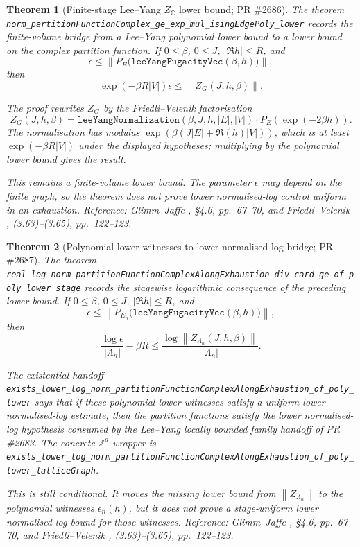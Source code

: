 \documentclass[a4paper,11pt]{article}
\newtheorem{theorem}{Theorem}
\begin{document}
\begin{theorem}[Finite-stage Lee--Yang \(Z_{\mathbb C}\) lower bound; PR \#2686]
The theorem
\texttt{norm\_partitionFunctionComplex\_ge\_exp\_mul\_isingEdgePoly\_lower}
records the finite-volume bridge from a Lee--Yang polynomial lower bound to a
lower bound on the complex partition function.  If \(0\le \beta\), \(0\le J\),
\(|\Re h|\le R\), and
\[
  \epsilon \le
  \left\|P_E\bigl(\texttt{leeYangFugacityVec}(\beta,h)\bigr)\right\|,
\]
then
\[
  \exp(-\beta R |V|)\epsilon
    \le \left\|Z_G(J,h,\beta)\right\|.
\]

The proof rewrites \(Z_G\) by the Friedli--Velenik factorisation
\[
  Z_G(J,h,\beta)=
  \texttt{leeYangNormalization}(\beta,J,h,|E|,|V|)
  \cdot P_E(\exp(-2\beta h)).
\]
The normalisation has modulus
\(\exp(\beta(J|E|+\Re(h)|V|))\), which is at least
\(\exp(-\beta R|V|)\) under the displayed hypotheses; multiplying by the
polynomial lower bound gives the result.

This remains a finite-volume lower bound.  The parameter \(\epsilon\) may
depend on the finite graph, so the theorem does not prove lower
normalised-log control uniform in an exhaustion.
Reference: Glimm--Jaffe \cite{glimm-jaffe}, \S 4.6, pp.~67--70, and
Friedli--Velenik \cite{friedli-velenik}, (3.63)--(3.65), pp.~122--123.
\end{theorem}

\begin{theorem}[Polynomial lower witnesses to lower normalised-log bridge; PR \#2687]
The theorem
\texttt{real\_log\_norm\_partitionFunctionComplexAlongExhaustion\_div\_card\_ge\_of\_poly\_lower\_stage}
records the stagewise logarithmic consequence of the preceding lower bound.
If \(0\le\beta\), \(0\le J\), \(|\Re h|\le R\), and
\[
  \epsilon \le
  \left\|P_{E_n}\bigl(\texttt{leeYangFugacityVec}(\beta,h)\bigr)\right\|,
\]
then
\[
  \frac{\log \epsilon}{|\Lambda_n|}-\beta R
    \le
  \frac{\log \left\|Z_{\Lambda_n}(J,h,\beta)\right\|}{|\Lambda_n|}.
\]

The existential handoff
\texttt{exists\_lower\_log\_norm\_partitionFunctionComplexAlongExhaustion\_of\_poly\_lower}
says that if these polynomial lower witnesses satisfy a uniform lower
normalised-log estimate, then the partition functions satisfy the lower
normalised-log hypothesis consumed by the Lee--Yang locally bounded family
handoff of PR \#2683.  The concrete
\(\mathbb Z^d\) wrapper is
\texttt{exists\_lower\_log\_norm\_partitionFunctionComplexAlongExhaustion\_of\_poly\_lower\_latticeGraph}.

This is still conditional.  It moves the missing lower bound from
\(\left\|Z_{\Lambda_n}\right\|\) to the polynomial witnesses
\(\epsilon_n(h)\), but it does not prove a stage-uniform lower
normalised-log bound for those witnesses.
Reference: Glimm--Jaffe \cite{glimm-jaffe}, \S 4.6, pp.~67--70, and
Friedli--Velenik \cite{friedli-velenik}, (3.63)--(3.65), pp.~122--123.
\end{theorem}
\end{document}
